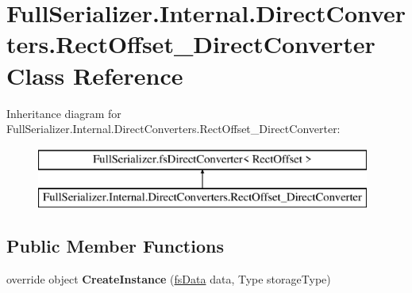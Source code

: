\hypertarget{class_full_serializer_1_1_internal_1_1_direct_converters_1_1_rect_offset___direct_converter}{}\section{Full\+Serializer.\+Internal.\+Direct\+Converters.\+Rect\+Offset\+\_\+\+Direct\+Converter Class Reference}
\label{class_full_serializer_1_1_internal_1_1_direct_converters_1_1_rect_offset___direct_converter}
Inheritance diagram for Full\+Serializer.\+Internal.\+Direct\+Converters.\+Rect\+Offset\+\_\+\+Direct\+Converter\+:\begin{figure}[H]
\begin{center}
\leavevmode
\includegraphics[height=2.000000cm]{class_full_serializer_1_1_internal_1_1_direct_converters_1_1_rect_offset___direct_converter}
\end{center}
\end{figure}
\subsection*{Public Member Functions}
\begin{DoxyCompactItemize}
\item 
\mbox{\label{class_full_serializer_1_1_internal_1_1_direct_converters_1_1_rect_offset___direct_converter_ab4ba48643e3a02b19257a4ab965f6a1d}} 
override object {\bfseries Create\+Instance} (\hyperlink{class_full_serializer_1_1fs_data}{fs\+Data} data, Type storage\+Type)
\end{DoxyCompactItemize}
